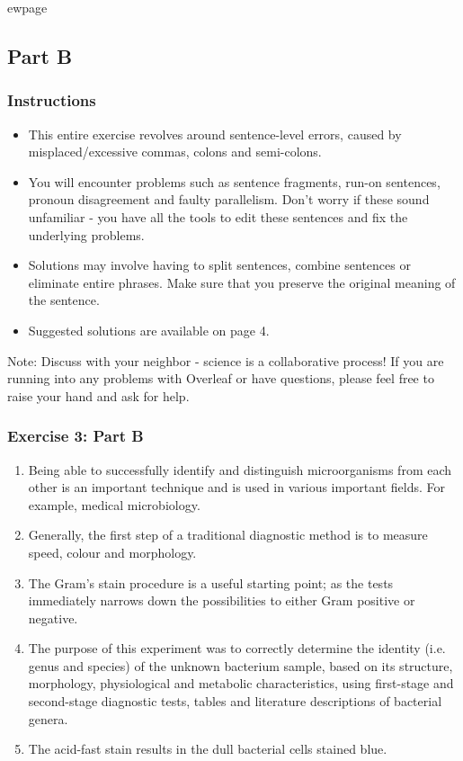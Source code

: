 \documentclass{article}
\begin{document}
ewpage
\subsection*{Part B}

\subsubsection*{Instructions}

\begin{itemize}
\item This entire exercise revolves around sentence-level errors, caused by misplaced/excessive commas, colons and semi-colons. 
\item You will encounter problems such as sentence fragments, run-on sentences, pronoun disagreement and faulty parallelism. Don't worry if these sound unfamiliar - you have all the tools to edit these sentences and fix the underlying problems.
\item Solutions may involve having to split sentences, combine sentences or eliminate entire phrases. Make sure that you preserve the original meaning of the sentence.
\item Suggested solutions are available on page 4. 
\end{itemize}

Note: Discuss with your neighbor - science is a collaborative process! If you are running into any problems with Overleaf or have questions, please feel free to raise your hand and ask for help. 

\subsubsection*{Exercise 3: Part B}

\begin{enumerate}
\item Being able to successfully identify and distinguish microorganisms from each other is an important technique and is used in various important fields. For example, medical microbiology.
\item Generally, the first step of a traditional diagnostic method is to measure speed, colour and morphology.
\item The Gram’s stain procedure is a useful starting point; as the tests immediately narrows down the possibilities to either Gram positive or negative. 
\item The purpose of this experiment was to correctly determine the identity (i.e. genus and species) of the unknown bacterium sample, based on its structure, morphology, physiological and metabolic characteristics, using first-stage and second-stage diagnostic tests, tables and literature descriptions of bacterial genera. 
\item The acid-fast stain results in the dull bacterial cells stained blue. 
\end{enumerate}
\end{document}
